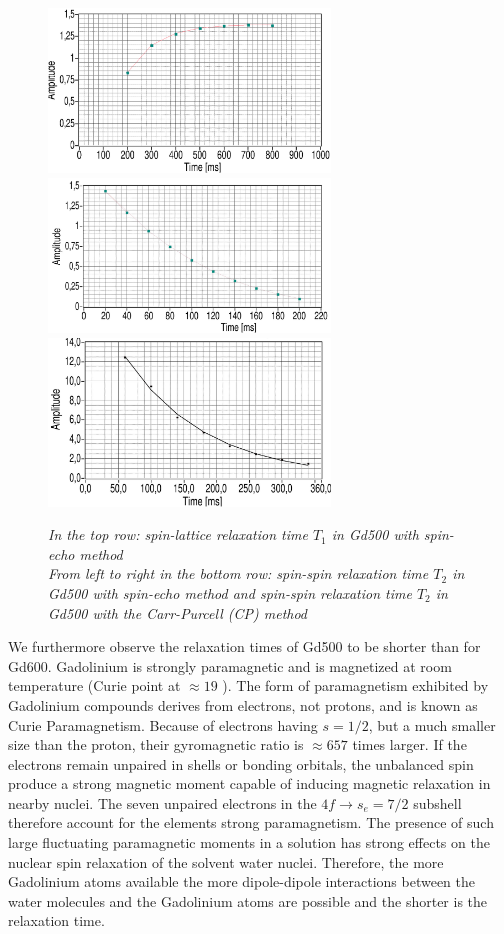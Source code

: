 \begin{figure}[h]
	\includegraphics[width=75mm]{GA500T1Fit}
	\includegraphics[width=75mm]{Gd500T2Fit}
	\includegraphics*[width=75mm]{Gd500T2CPFit}
	\centering
	\caption{\itshape In the top row: spin-lattice relaxation time $T_1$ in Gd500 with spin-echo method\\
		From left to right in the bottom row: spin-spin relaxation time $T_2$ in Gd500 with spin-echo method and spin-spin relaxation time $T_2$ in Gd500 with the Carr-Purcell (CP) method}
	\label{fig:4}
\end{figure}
\noindent
We furthermore observe the relaxation times of Gd500 to be shorter than for Gd600. Gadolinium is strongly paramagnetic and is magnetized at room temperature (Curie point at $\approx 19$ \textcelsius). The form of paramagnetism exhibited by Gadolinium compounds derives from electrons, not protons, and is known as Curie Paramagnetism. Because of electrons having $s=1/2$, but a much smaller size than the proton, their gyromagnetic ratio is $\approx 657$ times larger. If the electrons remain unpaired in shells or bonding orbitals, the unbalanced spin produce a strong magnetic moment capable of inducing magnetic relaxation in nearby nuclei. The seven unpaired electrons in the $4f \rightarrow s_e = 7/2$ subshell therefore account for the elements strong paramagnetism. \cite{Gadolinium} The presence of such large fluctuating paramagnetic moments in a solution has strong effects on the nuclear spin relaxation of the solvent water nuclei. Therefore, the more Gadolinium atoms available the more dipole-dipole interactions between the water molecules and the Gadolinium atoms are possible and the shorter is the relaxation time.
